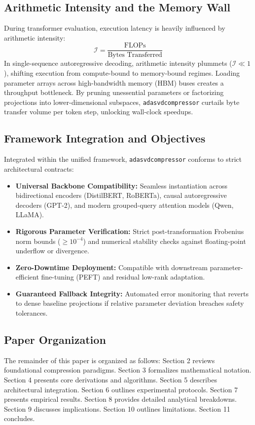 \documentclass{article}
\begin{document}
\subsection{Arithmetic Intensity and the Memory Wall}
During transformer evaluation, execution latency is heavily influenced by arithmetic intensity:
\[
\mathcal{I} = \frac{\text{FLOPs}}{\text{Bytes Transferred}}
\]
In single-sequence autoregressive decoding, arithmetic intensity plummets ($\mathcal{I} \ll 1$), shifting execution from compute-bound to memory-bound regimes. Loading parameter arrays across high-bandwidth memory (HBM) buses creates a throughput bottleneck. By pruning unessential parameters or factorizing projections into lower-dimensional subspaces, \texttt{adasvdcompressor} curtails byte transfer volume per token step, unlocking wall-clock speedups.

\subsection{Framework Integration and Objectives}
Integrated within the unified framework, \texttt{adasvdcompressor} conforms to strict architectural contracts:
\begin{itemize}
\item \textbf{Universal Backbone Compatibility:} Seamless instantiation across bidirectional encoders (DistilBERT, RoBERTa), causal autoregressive decoders (GPT-2), and modern grouped-query attention models (Qwen, LLaMA).
\item \textbf{Rigorous Parameter Verification:} Strict post-transformation Frobenius norm bounds ($\ge 10^{-4}$) and numerical stability checks against floating-point underflow or divergence.
\item \textbf{Zero-Downtime Deployment:} Compatible with downstream parameter-efficient fine-tuning (PEFT) and residual low-rank adaptation.
\item \textbf{Guaranteed Fallback Integrity:} Automated error monitoring that reverts to dense baseline projections if relative parameter deviation breaches safety tolerances.
\end{itemize}

\subsection{Paper Organization}
The remainder of this paper is organized as follows: Section 2 reviews foundational compression paradigms. Section 3 formalizes mathematical notation. Section 4 presents core derivations and algorithms. Section 5 describes architectural integration. Section 6 outlines experimental protocols. Section 7 presents empirical results. Section 8 provides detailed analytical breakdowns. Section 9 discusses implications. Section 10 outlines limitations. Section 11 concludes.
\end{document}
